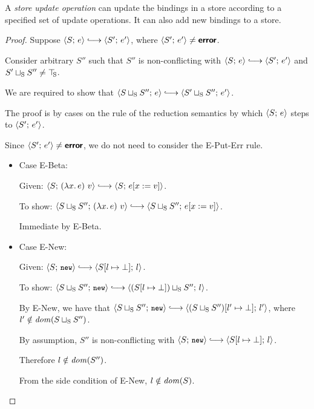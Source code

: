 
A \emph{store update operation} can update the bindings in a store
according to a specified set of update operations.  It can also add
new bindings to a store.

\LVarsDefStoreUpdateOperation

\begin{proof}
  Suppose $\config{S}{e} \parstepsto \config{S'}{e'}$, where
  $\langle S';\, e' \rangle \neq \textbf{\textsf{error}}$.

  Consider arbitrary $S''$ such that $S''$ is non-conflicting with
  $\config{S}{e} \parstepsto \config{S'}{e'}$ and $S' \sqcup_{\mathrm{S}} S''
  \neq \top\hspace{-0.85mm}_{\mathrm{S}}$.

  We are required to show that $\config{\lubstore{S}{S''}}{e}
  \parstepsto \config{\lubstore{S'}{S''}}{e'}$.

  The proof is by cases on the rule of the reduction semantics by
  which $\langle S;\, e \rangle$ steps to $\langle S';\, e' \rangle$.

  Since $\langle S';\, e' \rangle \neq \textbf{\textsf{error}}$, we do not need to consider the
  {\sc E-Put-Err} rule.
  \begin{itemize}

  \item Case {\sc E-Beta}:

    Given: $\config{S}{\app{(\lam{x}{e})}{v}} \parstepsto
    \config{S}{\subst{e}{x}{v}}$.

    To show: $\config{\lubstore{S}{S''}}{\app{(\lam{x}{e})}{v}}
    \parstepsto \config{\lubstore{S}{S''}}{\subst{e}{x}{v}}$.

    Immediate by {\sc E-Beta}.

  \item Case {\sc E-New}:

    Given: $\config{S}{\NEW} \parstepsto
    \config{\extSRaw{S}{l}{\bot}}{l}$.

    To show: $\config{\lubstore{S}{S''}}{\NEW} \parstepsto
    \config{\lubstore{(\extSRaw{S}{l}{\bot})}{S''}}{l}$.

    By {\sc E-New}, we have that $\config{\lubstore{S}{S''}}{\NEW}
    \parstepsto \config{\extSRaw{(\lubstore{S}{S''})}{l'}{\bot}}{l'}$,
    where $l' \notin \mathit{dom}(S \sqcup_{\mathrm{S}} S'')$.

    By assumption, $S''$ is non-conflicting with $\config{S}{\NEW}
    \parstepsto \config{\extSRaw{S}{l}{\bot}}{l}$.
    
    Therefore $l \notin \mathit{dom}(S'')$.

    From the side condition of {\sc E-New}, $l \notin \mathit{dom}(S)$.


\end{itemize}
\end{proof}
